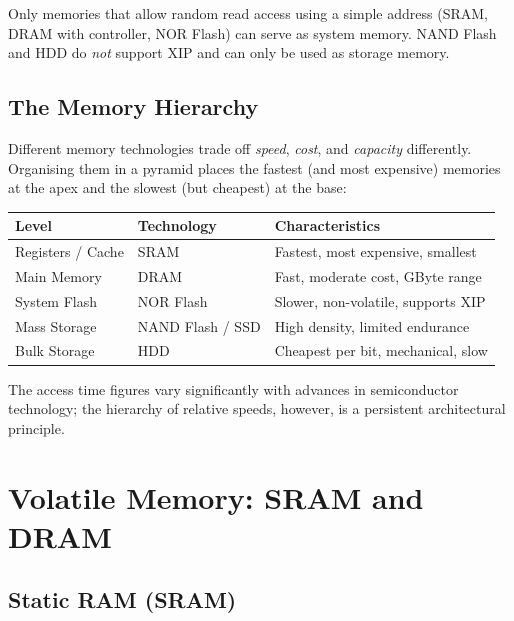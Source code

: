 \documentclass[11pt, a4paper, notitlepage]{report}
\theoremstyle{definition}
\theoremstyle{remark}
\theoremstyle{definition}
\begin{document}
\begin{keyresult}[title={Key Result: System Memory Must Support XIP}]
  Only memories that allow random read access using a simple address (SRAM, DRAM with controller, NOR Flash) can serve as system memory. NAND Flash and HDD do \emph{not} support XIP and can only be used as storage memory.
\end{keyresult}

\subsection{The Memory Hierarchy}
\label{sec:memory-hierarchy}

Different memory technologies trade off \emph{speed}, \emph{cost}, and \emph{capacity} differently. Organising them in a pyramid places the fastest (and most expensive) memories at the apex and the slowest (but cheapest) at the base:

\begin{center}
\renewcommand{\arraystretch}{1.3}
\begin{tabular}{lll}
  \toprule
  \textbf{Level} & \textbf{Technology} & \textbf{Characteristics} \\
  \midrule
  Registers / Cache & SRAM & Fastest, most expensive, smallest \\
  Main Memory       & DRAM & Fast, moderate cost, GByte range \\
  System Flash      & NOR Flash & Slower, non-volatile, supports XIP \\
  Mass Storage      & NAND Flash / SSD & High density, limited endurance \\
  Bulk Storage      & HDD & Cheapest per bit, mechanical, slow \\
  \bottomrule
\end{tabular}
\end{center}

The access time figures vary significantly with advances in semiconductor technology; the hierarchy of relative speeds, however, is a persistent architectural principle.

\section{Volatile Memory: SRAM and DRAM}
\label{ch:volatile}

\subsection{Static RAM (SRAM)}
\label{sec:sram}
\end{document}
